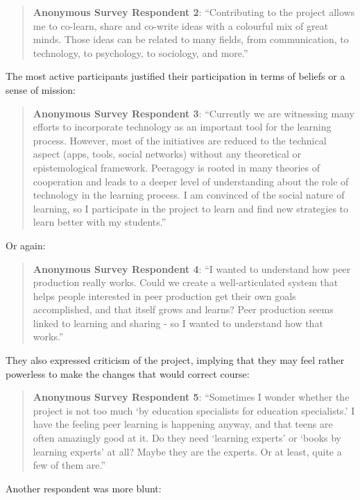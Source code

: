 \begin{quote}
\textbf{Anonymous Survey Respondent 2}: ``Contributing to the project
allows me to co-learn, share and co-write ideas with a colourful mix of
great minds. Those ideas can be related to many fields, from
communication, to technology, to psychology, to sociology, and more.''
\end{quote}

The most active participants justified their participation in terms of
beliefs or a sense of mission:

\begin{quote}
\textbf{Anonymous Survey Respondent 3}: ``Currently we are witnessing
many efforts to incorporate technology as an important tool for the
learning process. However, most of the initiatives are reduced to the
technical aspect (apps, tools, social networks) without any theoretical
or epistemological framework. Peeragogy is rooted in many theories of
cooperation and leads to a deeper level of understanding about the role
of technology in the learning process. I am convinced of the social
nature of learning, so I participate in the project to learn and find
new strategies to learn better with my students.''
\end{quote}

Or again:

\begin{quote}
\textbf{Anonymous Survey Respondent 4}: ``I wanted to understand how
peer production really works. Could we create a well-articulated
system that helps people interested in peer production get their own
goals accomplished, and that itself grows and learns? Peer production
seems linked to learning and sharing - so I wanted to understand how
that works.''
\end{quote}

They also expressed criticism of the project, implying that they may
feel rather powerless to make the changes that would correct course:

\begin{quote}
\textbf{Anonymous Survey Respondent 5}: ``Sometimes I wonder whether the
project is not too much `by education specialists for education
specialists.' I have the feeling peer learning is happening anyway, and
that teens are often amazingly good at it. Do they need `learning
experts' or `books by learning experts' at all? Maybe they are the
experts. Or at least, quite a few of them are.''
\end{quote}

Another respondent was more blunt:

